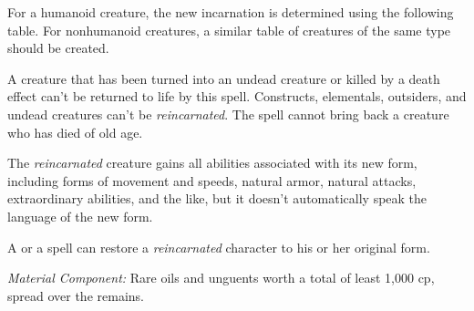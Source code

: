 {	For a humanoid creature, the new incarnation is determined using the following table. For nonhumanoid creatures, a similar table of creatures of the same type should be created.

	A creature that has been turned into an undead creature or killed by a death effect can't be returned to life by this spell.  Constructs, elementals, outsiders, and undead creatures can't be \emph{reincarnated}. The spell cannot bring back a creature who has died of old age.


	The \emph{reincarnated} creature gains all abilities associated with its new form, including forms of movement and speeds, natural armor, natural attacks, extraordinary abilities, and the like, but it doesn't automatically speak the language of the new form.

	A  or a  spell can restore a \emph{reincarnated} character to his or her original form.

	\textit{Material Component:}
	Rare oils and unguents worth a total of least 1,000 cp, spread over the remains.

}
